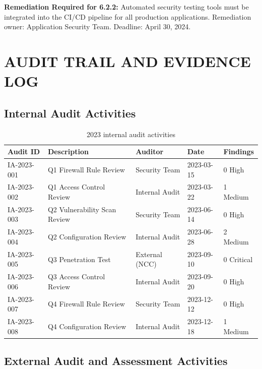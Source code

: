 \documentclass[
    language=english,
    doctype=compliance-document,
    institution=none,
]{../../omnilatex}
\begin{document}
\textbf{Remediation Required for 6.2.2:} Automated security testing tools must be integrated into the CI/CD pipeline for all production applications. Remediation owner: Application Security Team. Deadline: April 30, 2024.

\section{AUDIT TRAIL AND EVIDENCE LOG}

\subsection{Internal Audit Activities}

\begin{table}[h]
\centering
\small
\begin{tabular}{p{2.5cm}p{4cm}p{3cm}p{2.5cm}p{2cm}}
\toprule
\textbf{Audit ID} & \textbf{Description} & \textbf{Auditor} & \textbf{Date} & \textbf{Findings} \\
\midrule
IA-2023-001 & Q1 Firewall Rule Review & Security Team & 2023-03-15 & 0 High \\
IA-2023-002 & Q1 Access Control Review & Internal Audit & 2023-03-22 & 1 Medium \\
IA-2023-003 & Q2 Vulnerability Scan Review & Security Team & 2023-06-14 & 0 High \\
IA-2023-004 & Q2 Configuration Review & Internal Audit & 2023-06-28 & 2 Medium \\
IA-2023-005 & Q3 Penetration Test & External (NCC) & 2023-09-10 & 0 Critical \\
IA-2023-006 & Q3 Access Control Review & Internal Audit & 2023-09-20 & 0 High \\
IA-2023-007 & Q4 Firewall Rule Review & Security Team & 2023-12-12 & 0 High \\
IA-2023-008 & Q4 Configuration Review & Internal Audit & 2023-12-18 & 1 Medium \\
\bottomrule
\end{tabular}
\caption{2023 internal audit activities}
\end{table}

\subsection{External Audit and Assessment Activities}
\end{document}
